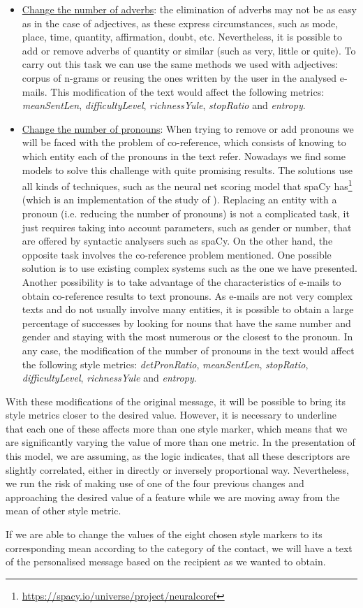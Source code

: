\begin{itemize}
	\item\underline{Change the number of adverbs}: the elimination of adverbs may not be as easy as in the case of adjectives, as these express circumstances, such as mode, place, time, quantity, affirmation, doubt, etc. Nevertheless, it is possible to add or remove adverbs of quantity or similar (such as very, little or quite). To carry out this task we can use the same methods we used with adjectives: corpus of n-grams or reusing the ones written by the user in the analysed e-mails. This modification of the text would affect the following metrics: \textit{meanSentLen}, \textit{difficultyLevel}, \textit{richnessYule}, \textit{stopRatio} and \textit{entropy}.
	
	\item\underline{Change the number of pronouns}: When trying to remove or add pronouns we will be faced with the problem of co-reference, which consists of knowing to which entity each of the pronouns in the text refer. Nowadays we find some models to solve this challenge with quite promising results. The solutions use all kinds of techniques, such as the neural net scoring model that spaCy has\footnote{\url{https://spacy.io/universe/project/neuralcoref}} (which is an implementation of the study of \cite{clark2016deep}). Replacing an entity with a pronoun (i.e. reducing the number of pronouns) is not a complicated task, it just requires taking into account parameters, such as gender or number, that are offered by syntactic analysers such as spaCy. On the other hand, the opposite task involves the co-reference problem mentioned. One possible solution is to use existing complex systems such as the one we have presented. Another possibility is to take advantage of the characteristics of e-mails to obtain co-reference results to text pronouns. As e-mails are not very complex texts and do not usually involve many entities, it is possible to obtain a large percentage of successes by looking for nouns that have the same number and gender and staying with the most numerous or the closest to the pronoun. In any case, the modification of the number of pronouns in the text would affect the following style metrics: \textit{detPronRatio}, \textit{meanSentLen}, \textit{stopRatio}, \textit{difficultyLevel}, \textit{richnessYule} and \textit{entropy}.
\end{itemize}

With these modifications of the original message, it will be possible to bring its style metrics closer to the desired value. However, it is necessary to underline that each one of these affects more than one style marker, which means that we are significantly varying the value of more than one metric. In the presentation of this model, we are assuming, as the logic indicates, that all these descriptors are slightly correlated, either in directly or inversely proportional way. Nevertheless, we run the risk of making use of one of the four previous changes and approaching the desired value of a feature while we are moving away from the mean of other style metric.

If we are able to change the values of the eight chosen style markers to its corresponding mean according to the category of the contact, we will have a text of the personalised message based on the recipient as we wanted to obtain.